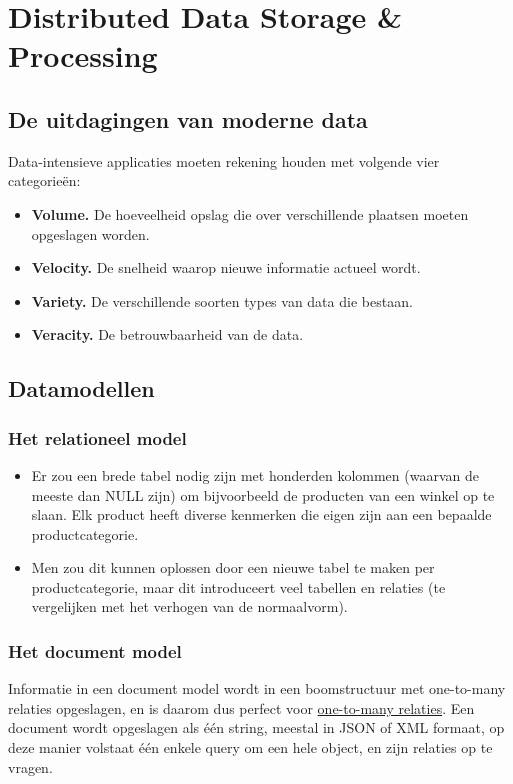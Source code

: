 \documentclass{report}
\begin{document}
	


 
	\part{Distributed Data Storage \& Processing}
	\chapter{De uitdagingen van moderne data}
	Data-intensieve applicaties moeten rekening houden met volgende vier categorieën:
	\begin{itemize}
		\item \textbf{Volume.} De hoeveelheid opslag die over verschillende plaatsen moeten opgeslagen worden.
		\item \textbf{Velocity.} De snelheid waarop nieuwe informatie actueel wordt.
		\item \textbf{Variety.} De verschillende soorten types van data die bestaan. 
		\item \textbf{Veracity.} De betrouwbaarheid van de data. 
	\end{itemize}
	\chapter{Datamodellen}
	\section{Het relationeel model}
	\begin{itemize}
		\item Er zou een brede tabel nodig zijn met honderden kolommen (waarvan de meeste dan NULL zijn) om bijvoorbeeld de producten van een winkel op te slaan. Elk product heeft diverse kenmerken die eigen zijn aan een bepaalde productcategorie.
		\item Men zou dit kunnen oplossen door een nieuwe tabel te maken per productcategorie, maar dit introduceert veel tabellen en relaties (te vergelijken met het verhogen van de normaalvorm).
	\end{itemize}
	\section{Het document model}
	Informatie in een document model wordt in een boomstructuur met one-to-many relaties opgeslagen, en is daarom dus perfect voor \underline{one-to-many relaties}. Een document wordt opgeslagen als één string, meestal in JSON of XML formaat, op deze manier volstaat één enkele query om een hele object, en zijn relaties op te vragen. 
\end{document}
